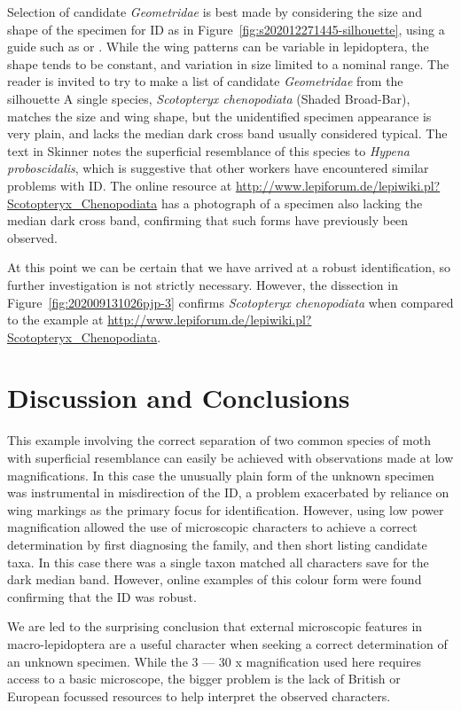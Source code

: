 \documentclass[]{article}
\begin{document}
Selection of candidate \textit{Geometridae} is best made by considering the size and shape of the specimen for ID as in Figure~\ref{fig:s202012271445-silhouette}, using  a guide such as \citet{Skinner1984} or \citet{Waring2018}.  While the wing patterns can be variable in lepidoptera, the shape tends to be constant, and variation in size limited to a nominal range.  The reader is invited to try to make a list of candidate \textit{Geometridae} from the silhouette
A single species, \textit{Scotopteryx chenopodiata} (Shaded Broad-Bar),  matches the size and wing shape,  but the unidentified specimen appearance is very plain,  and lacks the median dark cross band usually considered typical. The text in Skinner notes the superficial resemblance of this species to \textit{Hypena proboscidalis}, which is suggestive that other workers have encountered similar problems with ID. The online resource at \url{http://www.lepiforum.de/lepiwiki.pl?Scotopteryx_Chenopodiata} has a photograph of a specimen also lacking the median dark cross band, confirming that such forms have previously been observed.

At this point we can be certain that we have arrived at a robust identification, so further investigation is not strictly necessary. However, 
the dissection in Figure~\ref{fig:202009131026pjp-3}  confirms \textit{Scotopteryx chenopodiata} when compared to the example at \url{http://www.lepiforum.de/lepiwiki.pl?Scotopteryx_Chenopodiata}.

\section*{Discussion and Conclusions}
This example involving the correct separation of two common species of moth with superficial resemblance can easily be achieved with observations made at low magnifications. In this case the unusually plain form of the unknown specimen was instrumental in misdirection of the ID, a problem exacerbated by reliance on wing markings as the primary focus for identification. However, using low power magnification allowed the use of microscopic characters to achieve a correct determination by first diagnosing the family, and then short listing candidate taxa. In this case there was a single taxon  matched all characters save for the dark median band. However, online examples of this colour form were found confirming that the ID was robust.

We are led to the surprising conclusion that external microscopic features in macro-lepidoptera are a useful character when seeking a correct determination of an unknown specimen. While the  3 --- 30 x magnification used here requires access to a basic microscope, the bigger problem is the lack of British or European focussed resources to help interpret the observed characters.
\end{document}
